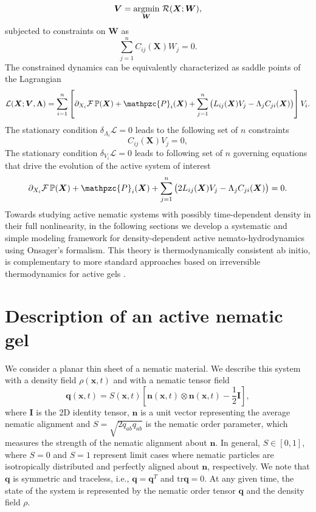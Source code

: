 \begin{equation}
	\bm{V}  = \underset{\bm{W}}{\textup{argmin}} \, \, \mathcal{R}(\bm{X}; \bm{W}),
\end{equation}
subjected to constraints on $\bm{W}$ as 
\begin{equation}
	\sum_{j=1}^{n}	C_{ij}(\bm{X}) W_j =0.
\end{equation}
The constrained dynamics can be equivalently characterized as saddle points of the Lagrangian 
\begin{equation}
	\mathcal{L}(\bm{X};\bm{V},\bm{\Lambda}) = 	\sum_{i=1}^n \left[\partial_{X_i} \mathcal{F}\,\mathbb{P}(\bm{X}) + \mathpzc{P}_i(\bm{X}) +  \sum_{j=1}^n \left(  L_{ij}(\bm{X})V_j    -   \Lambda_j  C_{ji}(\bm{X}) \right) \right]V_i .
\end{equation}
The stationary condition $\delta_{\Lambda_i}\mathcal{L}=0$ leads to the following set of $n$ constraints
\begin{equation}
	C_{ij}(\bm{X}) V_j=0,
\end{equation}
The stationary condition $\delta_{V_i}\mathcal{L}=0$ leads to  following set of $n$ governing equations that drive the evolution of the active system of interest
\begin{equation}
\partial_{X_i} \mathcal{F}\,\mathbb{P}(\bm{X}) + \mathpzc{P}_i(\bm{X}) +  \sum_{j=1}^n \left( 2L_{ij}(\bm{X})V_j    -   \Lambda_j  C_{ji}(\bm{X}) \right)  = 0.
\end{equation}
  Towards studying active nematic systems with possibly time-dependent density in their full nonlinearity, in the following sections we develop a systematic and simple modeling framework for density-dependent active nemato-hydrodynamics using  Onsager's formalism. This theory is thermodynamically consistent ab initio, is complementary to more standard approaches based on irreversible thermodynamics for active gels \cite{Prost:2015aa,julicher2018}.


	
\section{Description of an active nematic gel} \label{sec_1}

We consider a planar thin sheet of a nematic material. We describe this system with a density field $\rho(\bm{x},t)$ and with a nematic tensor field 
\begin{equation} 
	\label{eq:nematic_tensor}
	\bm{q}(\bm{x},t) =S(\bm{x},t) \left[\bm{n}(\bm{x},t) \otimes \bm{n}(\bm{x},t) - \frac{1}{2}\bm{I}\right] ,
\end{equation}
where $\bm{I}$ is the 2D identity tensor, $\bm{n}$ is a unit vector representing the average nematic alignment and $S=\sqrt{2 q_{ab}q_{ab}}$ is the nematic order parameter, which measures the strength of the nematic alignment about $\bm{n}$. In general, $S \in [0,1]$, where $\textit{S}=0$ and $\textit{S}=1$ represent limit cases where nematic particles are isotropically distributed and perfectly aligned about $\bm{n}$, respectively. We note that $\bm{q}$ is symmetric and traceless, i.e., $\bm{q}=\bm{q}^T$ and $\text{tr}\bm{q}=0$. At any given time, the state of the system is represented by the nematic order tensor $\bm{q}$ and the density field $\rho$.

